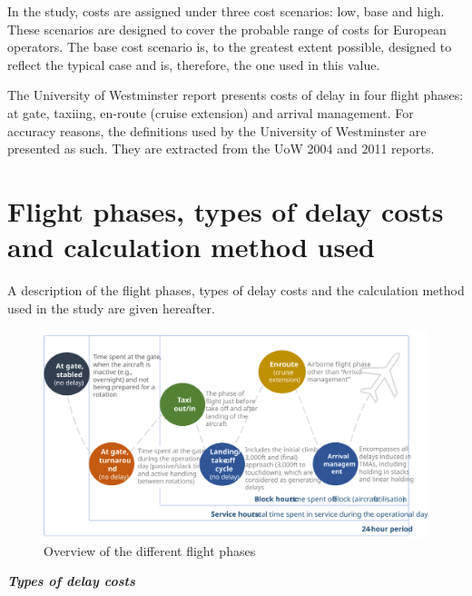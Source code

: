 \documentclass[
  11pt,
  a4paper,
]{book}
\begin{document}
In the study, costs are assigned under three cost scenarios: low, base
and high. These scenarios are designed to cover the probable range of
costs for European operators. The base cost scenario is, to the greatest
extent possible, designed to reflect the typical case and is, therefore,
the one used in this value.

The University of Westminster report presents costs of delay in four
flight phases: at gate, taxiing, en-route (cruise extension) and arrival
management. For accuracy reasons, the definitions used by the University
of Westminster are presented as such. They are extracted from the UoW
2004 and 2011 reports.

\hypertarget{flight-phases-types-of-delay-costs-and-calculation-method-used}{%
\section{Flight phases, types of delay costs and calculation method
used}\label{flight-phases-types-of-delay-costs-and-calculation-method-used}}

A description of the flight phases, types of delay costs and the
calculation method used in the study are given hereafter.

\begin{figure}

{\centering \includegraphics{chapters/../figures/flight_phases.svg}

}

\caption{\label{fig-flight-phases}Overview of the different flight
phases}

\end{figure}

\textbf{\emph{Types of delay costs}}
\end{document}
